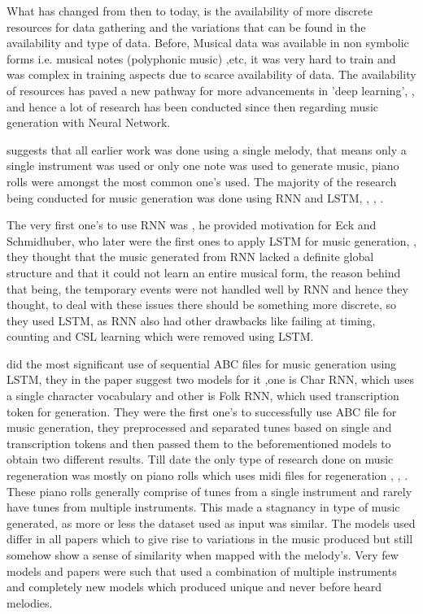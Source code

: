 \documentclass[oneside,12pt]{Classes/RoboticsLaTeX}
\begin{document}
What has changed from then to today, is the availability of more discrete resources for data gathering and the variations that can be found in the availability and type of data. Before, Musical data was available in non symbolic forms i.e. musical notes (polyphonic music) ,etc, it was very hard to train and was complex in training aspects due to scarce availability of data. The availability of resources has paved a new pathway for more advancements in 'deep learning', \cite{deeplearning}, and hence a lot of research has been conducted since then regarding music generation with Neural Network.

\cite{jpon} suggests that all earlier work was done using a single melody, that means only a single instrument was used or only one note was used to generate music, piano rolls were amongst the most common one's used. The majority  of the research being conducted for music generation was done using RNN and LSTM,  \cite{lstmtemporal}, \cite{rnnmelodies}, \cite{eck}.

The very first one's to use RNN was \cite{mozer}, he provided motivation for Eck and Schmidhuber, who later were the first ones to apply LSTM for music generation, \cite{eckschmid}, they thought that the music generated from RNN lacked a definite global structure and that it could not learn an entire musical form, the reason behind that being, the temporary events were not handled well by RNN and hence they thought, to deal with these issues there should be something more discrete, so they used LSTM, as RNN also had other drawbacks like failing at timing, counting and CSL learning which were removed using LSTM.

\cite{abcmusic} did the most significant use of sequential ABC files for music generation using LSTM, they in the paper suggest two models for it ,one is Char RNN, which uses a single character vocabulary and other is Folk RNN, which used transcription token for generation. They were the first one's to successfully use ABC file for music generation, they preprocessed and separated tunes based on single and transcription tokens and then passed them to the beforementioned models to obtain two different results. Till date the only type of research done on music regeneration was mostly on piano rolls which uses midi files for regeneration , \cite{midinet}, \cite{musegan}. These piano rolls generally comprise of tunes from a single instrument and rarely have tunes from multiple instruments. This made a stagnancy in type of music generated, as more or less the dataset used as input was similar. The models used differ in all papers which to give rise to variations in the music produced  but still somehow show a sense of similarity when mapped with the melody's. Very few models and papers were such that used a combination of multiple instruments and completely new models which produced unique and never before heard melodies.
\end{document}
